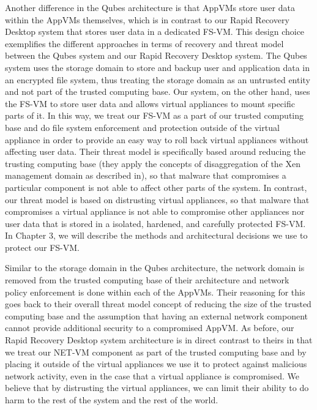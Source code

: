 Another difference in the Qubes architecture is that AppVMs store user data within the AppVMs themselves, which is in contrast to our Rapid Recovery Desktop system that stores user data in a dedicated FS-VM. This design choice exemplifies the different approaches in terms of recovery and threat model between the Qubes system and our Rapid Recovery Desktop system. The Qubes system uses the storage domain to store and backup user and application data in an encrypted file system, thus treating the storage domain as an untrusted entity and not part of the trusted computing base. Our system, on the other hand, uses the FS-VM to store user data and allows virtual appliances to mount specific parts of it. In this way, we treat our FS-VM as a part of our trusted computing base and do file system enforcement and protection outside of the virtual appliance in order to provide an easy way to roll back virtual appliances without affecting user data. Their threat model is specifically based around reducing the trusting computing base (they apply the concepts of disaggregation of the Xen management domain as described in\cite{murray_2008}), so that malware that compromises a particular component is not able to affect other parts of the system. In contrast, our threat model is based on distrusting virtual appliances, so that malware that compromises a virtual appliance is not able to compromise other appliances nor user data that is stored in a isolated, hardened, and carefully protected FS-VM. In Chapter 3, we will describe the methods and architectural decisions we use to protect our FS-VM.

Similar to the storage domain in the Qubes architecture, the network domain is removed from the trusted computing base of their architecture and network policy enforcement is done within each of the AppVMs. Their reasoning for this goes back to their overall threat model concept of reducing the size of the trusted computing base and the assumption that having an external network component cannot provide additional security to a compromised AppVM. As before, our Rapid Recovery Desktop system architecture is in direct contrast to theirs in that we treat our NET-VM component as part of the trusted computing base and by placing it outside of the virtual appliances we use it to protect against malicious network activity, even in the case that a virtual appliance is compromised. We believe that by distrusting the virtual appliances, we can limit their ability to do harm to the rest of the system and the rest of the world. 

